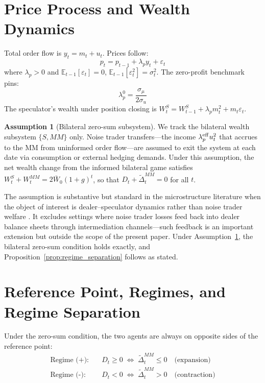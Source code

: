 \documentclass[12pt,a4paper]{article}
\theoremstyle{definition}
\newtheorem{assumption}[theorem]{Assumption}
\begin{document}
\section{Price Process and Wealth Dynamics}
\label{sec:price}

Total order flow is $y_t = m_t + u_t$. Prices follow:
\begin{equation}
  p_t = p_{t-1} + \lambda_p y_t + \varepsilon_t
\end{equation}
where $\lambda_p > 0$ and $\mathbb{E}_{t-1}[\varepsilon_t] = 0$,
$\mathbb{E}_{t-1}[\varepsilon^2_t] = \sigma^2_t$. The \citet{kyle1985}
zero-profit benchmark pins:
\begin{equation}
  \lambda^0_p = \frac{\sigma_\mu}{2\sigma_u}
  \label{eq:kyle_lambda}
\end{equation}
The speculator's wealth under position closing is
$W^S_t = W^S_{t-1} + \lambda_p m^2_t + m_t\varepsilon_t$.

\begin{assumption}[Bilateral zero-sum subsystem]
\label{ass:zerosum}
We track the bilateral wealth subsystem $\{S, MM\}$ only. Noise trader
transfers---the income $\lambda^{\rm eff}_p u^2_t$ that accrues to the
MM from uninformed order flow---are assumed to exit the system at each
date via consumption or external hedging demands. Under this assumption,
the net wealth change from the informed bilateral game satisfies
$W^S_t + W^{MM}_t = 2\bar{W}_0(1+g)^t$, so that
$D_t + \tilde{\Delta}^{MM}_t = 0$ for all $t$.
\end{assumption}

\noindent
The assumption is substantive but standard in the microstructure
literature when the object of interest is dealer--speculator dynamics
rather than noise trader welfare \citep{kyle1985,admati1988}. It
excludes settings where noise trader losses feed back into dealer
balance sheets through intermediation channels---such feedback is an
important extension but outside the scope of the present paper.
Under Assumption~\ref{ass:zerosum}, the bilateral zero-sum condition
holds exactly, and Proposition~\ref{prop:regime_separation} follows
as stated.

\section{Reference Point, Regimes, and Regime Separation}
\label{sec:regimes}

Under the zero-sum condition, the two agents are always on opposite
sides of the reference point:
\begin{align}
  \text{Regime (+):} & \quad D_t \geq 0 \;\Leftrightarrow\;
    \tilde{\Delta}^{MM}_t \leq 0 \quad \text{(expansion)} \\
  \text{Regime (-):} & \quad D_t < 0 \;\Leftrightarrow\;
    \tilde{\Delta}^{MM}_t > 0 \quad \text{(contraction)}
\end{align}
\end{document}

